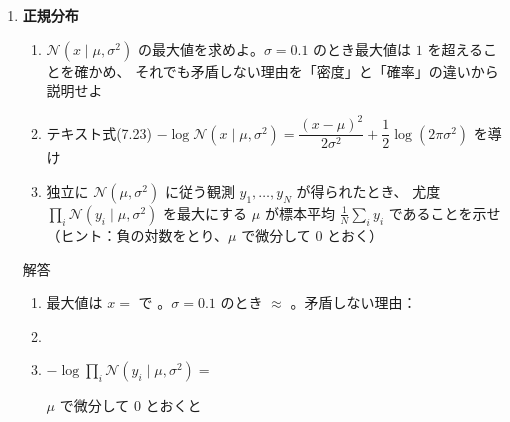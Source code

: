 \documentclass[a4paper,dvipdfmx]{jsarticle}
\newcommand{\提出期限}{2026年11月9日（月）}
\newcommand{\学籍番号}{0000000}
\newcommand{\氏名}{氏名を書く}
\newcommand{\提出日}{2026年11月9日}
\newenvironment{answer}{\begin{itembox}[l]{解答}}{\end{itembox}}
\begin{document}
\begin{enumerate}
  \item \textbf{正規分布}\quad
    \begin{enumerate}
      \item $\mathcal{N}(x \mid \mu, \sigma^2)$ の最大値を求めよ。$\sigma = 0.1$ のとき最大値は $1$ を超えることを確かめ、
        それでも矛盾しない理由を「密度」と「確率」の違いから説明せよ
      \item テキスト式(7.23) $-\log \mathcal{N}(x \mid \mu, \sigma^2) = \dfrac{(x - \mu)^2}{2\sigma^2} + \dfrac{1}{2}\log(2\pi\sigma^2)$ を導け
      \item 独立に $\mathcal{N}(\mu, \sigma^2)$ に従う観測 $y_1, \ldots, y_N$ が得られたとき、
        尤度 $\prod_i \mathcal{N}(y_i \mid \mu, \sigma^2)$ を最大にする $\mu$ が標本平均 $\frac{1}{N}\sum_i y_i$ であることを示せ
        （ヒント：負の対数をとり、$\mu$ で微分して $0$ とおく）
    \end{enumerate}
    \begin{answer}
      \begin{enumerate}
        \item 最大値は $x = $ \phantom{XX} で \phantom{XXXXXXXX}。$\sigma = 0.1$ のとき $\approx$ \phantom{XXXX}。矛盾しない理由：
          \vspace{10mm}
        \item
          \vspace{14mm}
        \item $-\log \prod_i \mathcal{N}(y_i \mid \mu, \sigma^2) = $ \phantom{XXXXXXXXXXXXXXXXXXXX}
          \vspace{2mm}

          $\mu$ で微分して $0$ とおくと
          \vspace{12mm}
      \end{enumerate}
    \end{answer}


\end{enumerate}
\end{document}
